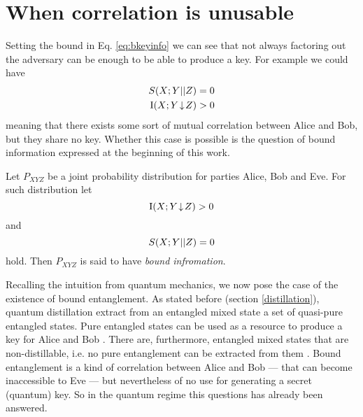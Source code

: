 \section{When correlation is unusable}
Setting the bound in Eq. \ref{eq:bkeyinfo} we can see that not always factoring out the adversary can be enough to be able to produce a key.
For example we could have 
\begin{align*}
	S(X;Y||Z) & = 0 \\
	\operatorname{I}(X;Y\!\downarrow\!Z) & > 0 
\end{align*}
meaning that there exists some sort of mutual correlation between Alice and Bob, but they share no key.
Whether this case is possible is the question of bound information expressed at the beginning of this work.
\begin{definition}\cite{GisWolf00, RW03} 
Let $P_{XYZ}$ be a joint probability distribution for parties Alice, Bob and Eve.
For such distribution let 
\begin{equation}
	\operatorname{I}(X;Y\!\downarrow\!Z) > 0
\end{equation}
and 
\begin{equation}
S(X;Y||Z) = 0
\end{equation}
hold.
Then $P_{XYZ}$ is said to have \emph{bound infromation}.
\end{definition}

Recalling the intuition from quantum mechanics, we now pose the case of the existence of bound entanglement.
As stated before (section \ref{distillation}), quantum distillation extract from an entangled mixed state a set of quasi-pure entangled states.
Pure entangled states can be used as a resource to produce a key for Alice and Bob \cite{Ekert91}.
There are, furthermore, entangled mixed states that are non-distillable, i.e. no pure entanglement can be extracted from them \cite{3H98}.
Bound entanglement is a kind of correlation between Alice and Bob --- that can become inaccessible to Eve --- but nevertheless of no use for generating a secret (quantum) key.
So in the quantum regime this questions has already been answered.
	
	
	
		
